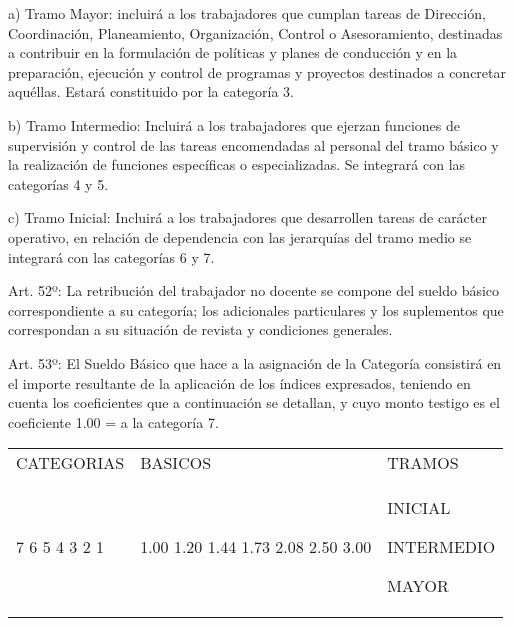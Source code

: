 \documentclass[]{article}
\let\oldparagraph\paragraph
\renewcommand{\paragraph}[1]{\oldparagraph{#1}\mbox{}}
\begin{document}
a) Tramo Mayor: incluirá a los trabajadores que cumplan tareas de
Dirección, Coordinación, Planeamiento, Organización, Control o
Asesoramiento, destinadas a contribuir en la formulación de políticas y
planes de conducción y en la preparación, ejecución y control de
programas y proyectos destinados a concretar aquéllas. Estará
constituido por la categoría 3.

b) Tramo Intermedio: Incluirá a los trabajadores que ejerzan funciones
de supervisión y control de las tareas encomendadas al personal del
tramo básico y la realización de funciones específicas o especializadas.
Se integrará con las categorías 4 y 5.

c) Tramo Inicial: Incluirá a los trabajadores que desarrollen tareas de
carácter operativo, en relación de dependencia con las jerarquías del
tramo medio se integrará con las categorías 6 y 7.

\hyperdef{}{retribuciones}{\paragraph{Retribuciones}\label{retribuciones}}

Art. 52º: La retribución del trabajador no docente se compone del sueldo
básico correspondiente a su categoría; los adicionales particulares y
los suplementos que correspondan a su situación de revista y condiciones
generales.

Art. 53º: El Sueldo Básico que hace a la asignación de la Categoría
consistirá en el importe resultante de la aplicación de los índices
expresados, teniendo en cuenta los coeficientes que a continuación se
detallan, y cuyo monto testigo es el coeficiente 1.00 = a la categoría
7.

\begin{longtable}[c]{@{}lll@{}}
\toprule
\begin{minipage}[t]{0.18\columnwidth}\raggedright\strut
CATEGORIAS
\strut\end{minipage} &
\begin{minipage}[t]{0.16\columnwidth}\raggedright\strut
BASICOS
\strut\end{minipage} &
\begin{minipage}[t]{0.18\columnwidth}\raggedright\strut
TRAMOS
\strut\end{minipage}\tabularnewline
\begin{minipage}[t]{0.18\columnwidth}\raggedright\strut
7 6 5 4 3 2 1
\strut\end{minipage} &
\begin{minipage}[t]{0.16\columnwidth}\raggedright\strut
1.00 1.20 1.44 1.73 2.08 2.50 3.00
\strut\end{minipage} &
\begin{minipage}[t]{0.18\columnwidth}\raggedright\strut
INICIAL

INTERMEDIO

MAYOR
\strut\end{minipage}\tabularnewline
\bottomrule
\end{longtable}
\end{document}
